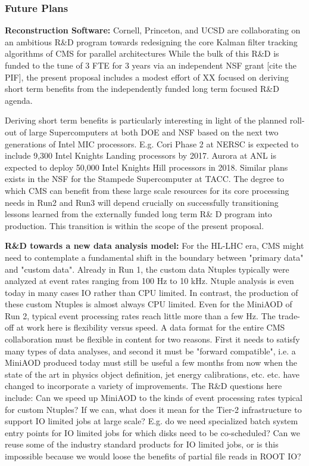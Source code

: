 \documentclass[11pt,a4paper]{article}
\begin{document}
\subsubsection{Future Plans}

{\bf Reconstruction Software:}
Cornell, Princeton, and UCSD are collaborating on an ambitious R\&D program towards redesigning the core Kalman filter tracking algorithms of CMS for parallel architectures While the bulk of this R\&D is funded to the tune of 3 FTE for 3 years
via an independent NSF grant [cite the PIF], the present proposal includes a modest effort of XX focused on deriving short term
benefits from the independently funded long term focused R\&D agenda.

Deriving short term benefits is particularly interesting in light of the planned roll-out of large Supercomputers at both DOE and NSF
based on the next two generations of Intel MIC processors. E.g. Cori Phase 2 at NERSC is expected to 
include 9,300 Intel Knights Landing processors by 2017. Aurora at ANL is expected to deploy 50,000 Intel Knights Hill processors in 2018.
Similar plans exists in the NSF for the Stampede Supercomputer at TACC.
The degree to which CMS can benefit from these large scale resources
for its core processing needs in Run2 and Run3 
will depend crucially on successfully transitioning lessons learned from the externally funded 
long term R\& D program into production. This transition is within the scope of the present proposal.

{\bf R\&D towards a new data analysis model:}
For the HL-LHC era, CMS might need to contemplate a fundamental shift in the boundary between "primary data" and "custom data".
Already in Run 1, the custom data Ntuples typically were analyzed at event rates ranging from 100 Hz to 10 kHz. 
Ntuple analysis is even today
in many cases IO rather than CPU limited. In contrast, the production of these custom Ntuples is almost always CPU limited. Even for the MiniAOD of Run 2, typical event processing rates reach little more than a few Hz.
The trade-off at work here is flexibility versus speed. A data format for the entire CMS collaboration must be flexible in content for two reasons. First it needs to satisfy many types of data analyses, and second it must be "forward compatible", i.e. a MiniAOD produced today
must still be useful a few months from now when the state of the art in physics object definition, jet energy calibrations, etc. etc. have
changed to incorporate a variety of improvements. The R\&D questions here include: Can we speed up MiniAOD to the kinds of 
event processing rates typical for custom Ntuples? If we can, what does it mean for the Tier-2 infrastructure to support IO limited
jobs at large scale? E.g. do we need specialized batch system entry points for IO limited jobs for which disks need to be co-scheduled?
Can we reuse some of the industry standard products for IO limited jobs, or is this impossible because we would loose the benefits of partial file reads in ROOT IO?
\end{document}
